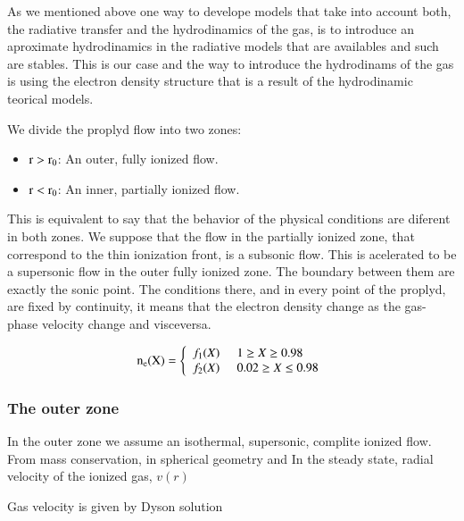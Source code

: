 \documentclass[aaspp]{article}
\begin{document}
As we mentioned above one way to develope models that take into account both, the radiative transfer and the hydrodinamics of the gas, is to introduce an aproximate hydrodinamics in the radiative models that are availables and such are stables. This is our case and the way to introduce the hydrodinams of the gas is using the electron density structure that is a result of the hydrodinamic teorical models.

We divide the proplyd flow into two zones:

\begin{itemize}
  \item{$\rm r > r_0$: An outer, fully ionized flow.}
    \item{$\rm r < r_0$: An inner, partially ionized flow.}
\end{itemize}

This is equivalent to say that the behavior of the physical conditions are diferent in both zones. We suppose that the flow in the partially ionized zone, that correspond to the thin ionization front, is a subsonic flow. This is acelerated to be a supersonic flow in the outer fully ionized zone. The boundary between them are exactly the sonic point. The conditions there, and in every point of the proplyd, are fixed by continuity, it means that the electron density change as the gas-phase velocity change and visceversa. 

\begin{equation}
  \rm n_e(X) = \left\lbrace
    \begin{array}{l}
      f_1(X) \;\;\;\;\; 1 \ge X \ge 0.98 \\
      f_2(X) \;\;\;\;\;  0.02 \ge X \le 0.98  \\
    \end{array}
  \right.
\end{equation}

\subsubsection{The outer zone}
\label{sec:outer}

\citep{2002ApJ...566..315H}

In the outer zone we assume an isothermal, supersonic, complite
ionized flow. From mass conservation, in spherical geometry and In the
steady state, radial velocity of the ionized gas, $v(r)$

Gas velocity is given by Dyson solution \citep{1968Ap&SS...1..388D}
\end{document}
